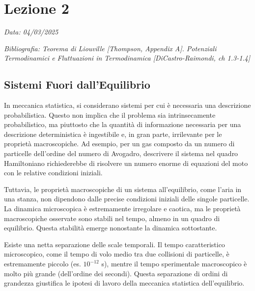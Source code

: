 \chapter{Lezione 2}
\label{chap:lezione_02} %

\begin{flushright}
\textit{Data: 04/03/2025}
\end{flushright}
\textit{Bibliografia: Teorema di Liouville [Thompson, Appendix A]. Potenziali Termodinamici e Fluttuazioni in Termodinamica [DiCastro-Raimondi, ch 1.3-1.4]}


\section{Sistemi Fuori dall'Equilibrio}

In meccanica statistica, si considerano sistemi per cui è necessaria una descrizione probabilistica. Questo non implica che il problema sia intrinsecamente probabilistico, ma piuttosto che la quantità di informazione necessaria per una descrizione deterministica è ingestibile e, in gran parte, irrilevante per le proprietà macroscopiche. Ad esempio, per un gas composto da un numero di particelle dell'ordine del numero di Avogadro, descrivere il sistema nel quadro Hamiltoniano richiederebbe di risolvere un numero enorme di equazioni del moto con le relative condizioni iniziali.

Tuttavia, le proprietà macroscopiche di un sistema all'equilibrio, come l'aria in una stanza, non dipendono dalle precise condizioni iniziali delle singole particelle. La dinamica microscopica è estremamente irregolare e caotica, ma le proprietà macroscopiche osservate sono stabili nel tempo, almeno in un quadro di equilibrio. Questa stabilità emerge nonostante la dinamica sottostante.

Esiste una netta separazione delle scale temporali. Il tempo caratteristico microscopico, come il tempo di volo medio tra due collisioni di particelle, è estremamente piccolo (es. $10^{-12}$ s), mentre il tempo sperimentale macroscopico è molto più grande (dell'ordine dei secondi). Questa separazione di ordini di grandezza giustifica le ipotesi di lavoro della meccanica statistica dell'equilibrio.

